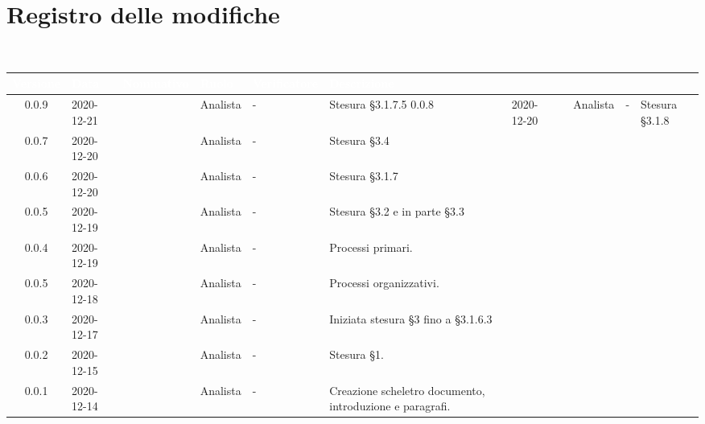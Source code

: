 \section*{Registro delle modifiche}
\setcounter{table}{-1}
{
\
\renewcommand{\arraystretch}{1.5}
\centering
\begin{longtable}{c C{2.6cm} C{2.6cm} C{2.6cm} C{2.6cm} C{3.5cm}}
\rowcolor{coloreRosso}
\textcolor{white}{\textbf{Versione}}&
\textcolor{white}{\textbf{Data}}&
\textcolor{white}{\textbf{Nominativo}}&
\textcolor{white}{\textbf{Ruolo}}&
\textcolor{white}{\textbf{Verificatore}}&
\textcolor{white}{\textbf{Descrizione}}\\	
\endhead

0.0.9 & 2020-12-21 & \PA{} & Analista & - & Stesura \S 3.1.7.5
0.0.8 & 2020-12-20 & \PA{} & Analista & - & Stesura \S 3.1.8 \\
0.0.7 & 2020-12-20 & \RA{} & Analista & - & Stesura \S 3.4 \\
0.0.6 & 2020-12-20 & \PA{} & Analista & - & Stesura \S 3.1.7 \\
0.0.5 & 2020-12-19 & \RA{} & Analista & - & Stesura \S 3.2 e in parte \S 3.3 \\
0.0.4 & 2020-12-19 & \ZM{} & Analista & - & Processi primari. \\
0.0.5 & 2020-12-18 & \SH{} & Analista & - & Processi organizzativi. \\
0.0.3 & 2020-12-17 & \PA{} & Analista & - & Iniziata stesura \S 3 fino a \S 3.1.6.3 \\
0.0.2 & 2020-12-15 & \PA{} & Analista & - & Stesura \S 1. \\
0.0.1 & 2020-12-14 & \ZM{} & Analista & - & Creazione scheletro documento, introduzione e paragrafi. \\
		
\end{longtable}
}
